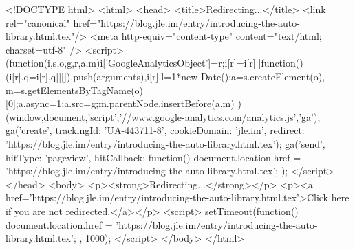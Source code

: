 <!DOCTYPE html>
<html>
<head>
<title>Redirecting...</title>
<link rel="canonical" href="https://blog.jle.im/entry/introducing-the-auto-library.html.tex"/>
<meta http-equiv="content-type" content="text/html; charset=utf-8" />
<script>
(function(i,s,o,g,r,a,m){i['GoogleAnalyticsObject']=r;i[r]=i[r]||function(){
(i[r].q=i[r].q||[]).push(arguments)},i[r].l=1*new Date();a=s.createElement(o),
m=s.getElementsByTagName(o)[0];a.async=1;a.src=g;m.parentNode.insertBefore(a,m)
})(window,document,'script','//www.google-analytics.com/analytics.js','ga');
ga('create', { trackingId: 'UA-443711-8', cookieDomain: 'jle.im', redirect: 'https://blog.jle.im/entry/introducing-the-auto-library.html.tex'});
ga('send', { hitType: 'pageview', hitCallback: function() { document.location.href = 'https://blog.jle.im/entry/introducing-the-auto-library.html.tex'; } });
</script>
</head>
<body>
  <p><strong>Redirecting...</strong></p>
  <p><a href='https://blog.jle.im/entry/introducing-the-auto-library.html.tex'>Click here if you are not redirected.</a></p>
  <script>
    setTimeout(function() { document.location.href = 'https://blog.jle.im/entry/introducing-the-auto-library.html.tex'; }, 1000);
  </script>
</body>
</html>
